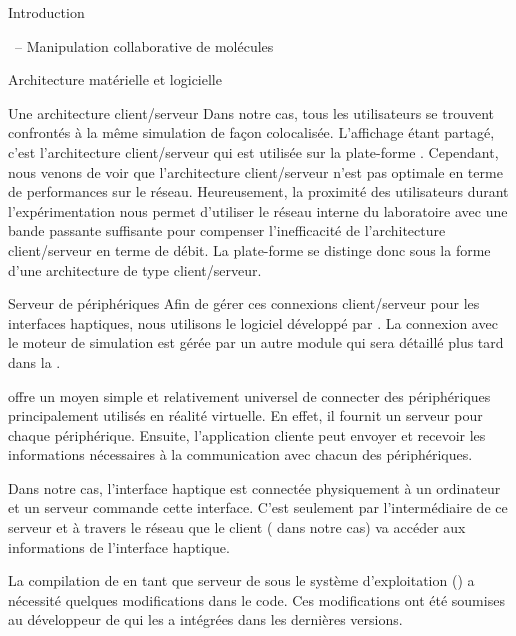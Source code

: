\documentclass[myfrancais]{mythesis}
\begin{document}
\begin{mypart}{Introduction}
\begin{mychapter}{\myShaddock\ -- Manipulation collaborative de molécules}
\begin{mysection}{Architecture matérielle et logicielle}
\begin{mysubsection}{Une architecture client/serveur}
					Dans notre cas, tous les utilisateurs se trouvent confrontés à la même simulation de façon colocalisée.
					L'affichage étant partagé, c'est l'architecture client/serveur qui est utilisée sur la plate-forme \myShaddock.
					Cependant, nous venons de voir que l'architecture client/serveur n'est pas optimale en terme de performances sur le réseau.
					Heureusement, la proximité des utilisateurs durant l'expérimentation nous permet d'utiliser le réseau interne du laboratoire avec une bande passante suffisante pour compenser l'inefficacité de l'architecture client/serveur en terme de débit.
					La plate-forme \myShaddock se distinge donc sous la forme d'une architecture de type client/serveur.
					\begin{mysubsubsection}{Serveur de périphériques}
						Afin de gérer ces connexions client/serveur pour les interfaces haptiques, nous utilisons le logiciel  développé par .
						La connexion avec le moteur de simulation est gérée par un autre module qui sera détaillé plus tard dans la .

						 offre un moyen simple et relativement universel de connecter des périphériques principalement utilisés en réalité virtuelle.
						En effet, il fournit un serveur pour chaque périphérique.
						Ensuite, l'application cliente peut envoyer et recevoir les informations nécessaires à la communication avec chacun des périphériques.

						Dans notre cas, l'interface haptique est connectée physiquement à un ordinateur et un serveur  commande cette interface.
						C'est seulement par l'intermédiaire de ce serveur  et à travers le réseau que le client ( dans notre cas) va accéder aux informations de l'interface haptique.

						La compilation de  en tant que serveur de \myOmni sous le système d'exploitation \myLinux (\myUbuntu) a nécessité quelques modifications dans le code.
						Ces modifications ont été soumises au développeur de  qui les a intégrées dans les dernières versions.


\end{mysubsubsection}
\end{mysubsection}
\end{mysection}
\end{mychapter}
\end{mypart}
\end{document}
